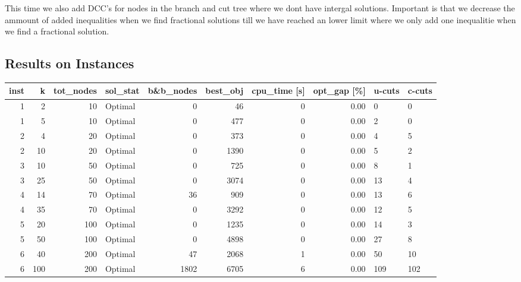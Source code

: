 \documentclass[11pt]{article}
\begin{document}
This time we also add DCC's for nodes in the branch and cut tree where we dont have intergal solutions. Important is that we decrease the ammount of added inequalities when we find fractional solutions till we have reached an lower limit where we only add one inequalitie when we find a fractional solution.

\subsection{Results on Instances}

\begin{tabular}{rrrlrrrrll}
\toprule
 inst &     k &  tot\_nodes &  sol\_stat &  b\&b\_nodes &  best\_obj &  cpu\_time [s] &  opt\_gap [\%] & u-cuts & c-cuts \\
\midrule
    1 &     2 &         10 &   Optimal &          0 &        46 &             0 &         0.00 &      0 &      0 \\
    1 &     5 &         10 &   Optimal &          0 &       477 &             0 &         0.00 &      2 &      0 \\
    2 &     4 &         20 &   Optimal &          0 &       373 &             0 &         0.00 &      4 &      5 \\
    2 &    10 &         20 &   Optimal &          0 &      1390 &             0 &         0.00 &      5 &      2 \\
    3 &    10 &         50 &   Optimal &          0 &       725 &             0 &         0.00 &      8 &      1 \\
    3 &    25 &         50 &   Optimal &          0 &      3074 &             0 &         0.00 &     13 &      4 \\
    4 &    14 &         70 &   Optimal &         36 &       909 &             0 &         0.00 &     13 &      6 \\
    4 &    35 &         70 &   Optimal &          0 &      3292 &             0 &         0.00 &     12 &      5 \\
    5 &    20 &        100 &   Optimal &          0 &      1235 &             0 &         0.00 &     14 &      3 \\
    5 &    50 &        100 &   Optimal &          0 &      4898 &             0 &         0.00 &     27 &      8 \\
    6 &    40 &        200 &   Optimal &         47 &      2068 &             1 &         0.00 &     50 &     10 \\
    6 &   100 &        200 &   Optimal &       1802 &      6705 &             6 &         0.00 &    109 &    102 \\

\end{tabular}
\end{document}
